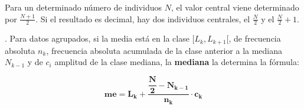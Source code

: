 Para un determinado número de individuos $N$, el valor central viene determinado por $ \frac{N+1}{2}$. Si el resultado es decimal, hay dos individuos centrales, el  $\frac{N}{2}$ y el $\frac N 2 + 1$.

\vspace{5mm}%
\begin{theorem}
	. Para datos agrupados, si la media está en la clase $[L_k,L_{k+1}[$, de frecuencia absoluta $n_k$, frecuencia absoluta acumulada de la clase anterior a la mediana $N_{k-1}$ y de  $c_i$  amplitud de la clase mediana, la \textbf{mediana} la determina la fórmula:	
	
	$$\boldsymbol{ me=L_k+\dfrac{\dfrac N 2 - N_{k-1}}{n_{k}}\cdot c_k }$$
\end{theorem}


\vspace{5mm}%
